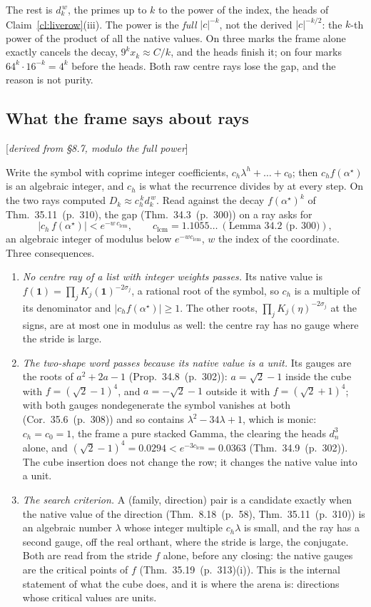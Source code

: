 \documentclass[11pt]{article}
\newcommand{\one}{\mathbf 1}
\newcommand{\status}[1]{\hfill{\small[\textit{#1}]}}
\newcommand{\hb}[2]{#1~(p.~#2)}   %
\theoremstyle{plain}
\theoremstyle{remark}
\begin{document}
The rest is $d_k^{\,w}$, the primes up to $k$ to the power of the index, the heads of Claim~\ref{cl:liverow}(iii). The power is the \emph{full} $|c|^{-k}$, not the derived $|c|^{-k/2}$: the $k$-th power of the product of all the native values. On three marks the frame alone exactly cancels the decay, $9^kx_k\approx C/k$, and the heads finish it; on four marks $64^k\cdot16^{-k}=4^k$ before the heads. Both raw centre rays lose the gap, and the reason is not purity.

\subsection{What the frame says about rays}\status{derived from \S8.7, modulo the full power}

Write the symbol with coprime integer coefficients, $c_h\lambda^h+\dots+c_0$; then $c_hf(\alpha^\star)$ is an algebraic integer, and $c_h$ is what the recurrence divides by at every step. On the two rays computed $D_k\approx c_h^{\,k}d_k^{\,w}$. Read against the decay $f(\alpha^\star)^k$ of Thm.~\hb{35.11}{310}, the gap (Thm.~\hb{34.3}{300}) on a ray asks for
\[
\big|c_h\,f(\alpha^\star)\big|<e^{-w\,c_{\mathrm{lcm}}},\qquad c_{\mathrm{lcm}}=1.1055\ldots\ (\text{Lemma~\hb{34.2}{300}}),
\]
an algebraic integer of modulus below $e^{-w c_{\mathrm{lcm}}}$, $w$ the index of the coordinate. Three consequences.
\begin{enumerate}[label=(\roman*)]
\item \emph{No centre ray of a list with integer weights passes.} Its native value is $f(\one)=\prod_jK_j(\one)^{-2\sigma_j}$, a rational root of the symbol, so $c_h$ is a multiple of its denominator and $|c_hf(\alpha^\star)|\ge1$. The other roots, $\prod_jK_j(\eta)^{-2\sigma_j}$ at the signs, are at most one in modulus as well: the centre ray has no gauge where the stride is large.
\item \emph{The two-shape word passes because its native value is a unit.} Its gauges are the roots of $a^2+2a-1$ (Prop.~\hb{34.8}{302}): $a=\sqrt2-1$ inside the cube with $f=(\sqrt2-1)^4$, and $a=-\sqrt2-1$ outside it with $f=(\sqrt2+1)^4$; with both gauges nondegenerate the symbol vanishes at both (Cor.~\hb{35.6}{308}) and so contains $\lambda^2-34\lambda+1$, which is monic: $c_h=c_0=1$, the frame a pure stacked Gamma, the clearing the heads $d_n^3$ alone, and $(\sqrt2-1)^4=0.0294<e^{-3c_{\mathrm{lcm}}}=0.0363$ (Thm.~\hb{34.9}{302}). The cube insertion does not change the row; it changes the native value into a unit.
\item \emph{The search criterion.} A (family, direction) pair is a candidate exactly when the native value of the direction (Thm.~\hb{8.18}{58}, Thm.~\hb{35.11}{310}) is an algebraic number $\lambda$ whose integer multiple $c_h\lambda$ is small, and the ray has a second gauge, off the real orthant, where the stride is large, the conjugate. Both are read from the stride $f$ alone, before any closing: the native gauges are the critical points of $f$ (Thm.~\hb{35.19}{313}(i)). This is the internal statement of what the cube does, and it is where the arena is: directions whose critical values are units.
\end{enumerate}
\end{document}
